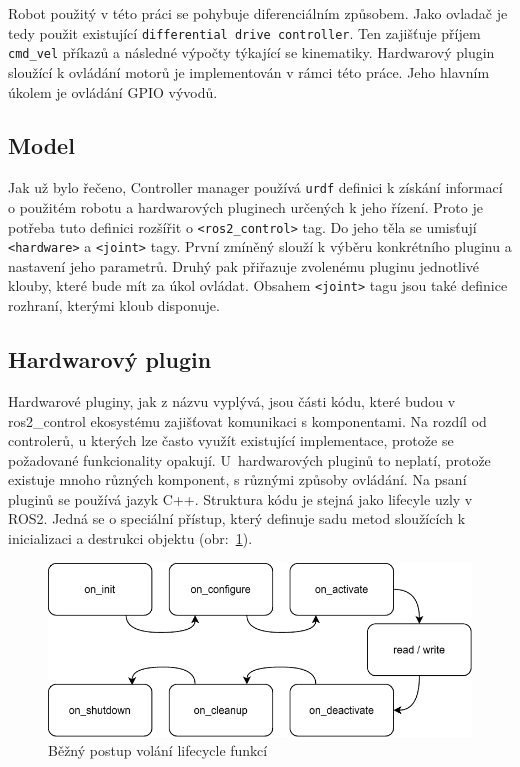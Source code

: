 Robot použitý v této práci se pohybuje diferenciálním způsobem. Jako ovladač je tedy použit existující \verb|differential drive controller|. Ten zajišťuje příjem \verb|cmd_vel| příkazů a následné výpočty týkající se kinematiky. Hardwarový plugin sloužící k ovládání motorů je implementován v rámci této práce. Jeho hlavním úkolem je ovládání GPIO vývodů.

\subsection*{Model}
Jak už bylo řečeno, Controller manager používá \verb|urdf| definici k získání informací o použitém robotu a hardwarových pluginech určených k jeho řízení. Proto je potřeba tuto definici rozšířit o \verb|<ros2_control>| tag. Do jeho těla se umisťují \verb|<hardware>| a \verb|<joint>| tagy. První zmíněný slouží k výběru konkrétního pluginu a nastavení jeho parametrů. Druhý pak přiřazuje zvolenému pluginu jednotlivé klouby, které bude mít za úkol ovládat. Obsahem \verb|<joint>| tagu jsou také definice rozhraní, kterými kloub disponuje. \cite{ros2_control_documentation}

\subsection*{Hardwarový plugin}
Hardwarové pluginy, jak z názvu vyplývá, jsou části kódu, které budou v ros2\_control ekosystému zajišťovat komunikaci s komponentami. Na rozdíl od controlerů, u kterých lze často využít existující implementace, protože se požadované funkcionality opakují. U~hardwarových pluginů to neplatí, protože existuje mnoho různých komponent, s různými způsoby ovládání. Na psaní pluginů se používá jazyk C++. Struktura kódu je stejná jako lifecyle uzly v ROS2. Jedná se o speciální přístup, který definuje sadu metod sloužících k inicializaci a destrukci objektu (obr:~\ref{fig:lifecycle_diagram}).

\begin{figure}[h!]
	\centering
	\includegraphics[scale=0.8]{obrazky-figures/ros2_control_wh_plugin_transitions.pdf}
	\caption{Běžný postup volání lifecycle funkcí}
	\label{fig:lifecycle_diagram}
\end{figure}

